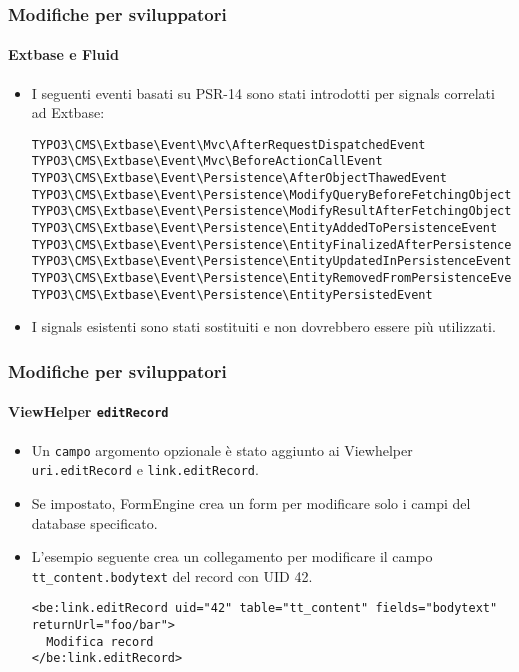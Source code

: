 \begin{frame}[fragile]
	\frametitle{Modifiche per sviluppatori}
	\framesubtitle{Extbase e Fluid}

	\lstset{basicstyle=\tiny\ttfamily}

	\begin{itemize}
		\item I seguenti eventi basati su PSR-14 sono stati introdotti per signals correlati ad Extbase:

\vspace{-0.4cm}
\begin{lstlisting}
TYPO3\CMS\Extbase\Event\Mvc\AfterRequestDispatchedEvent
TYPO3\CMS\Extbase\Event\Mvc\BeforeActionCallEvent
TYPO3\CMS\Extbase\Event\Persistence\AfterObjectThawedEvent
TYPO3\CMS\Extbase\Event\Persistence\ModifyQueryBeforeFetchingObjectDataEvent
TYPO3\CMS\Extbase\Event\Persistence\ModifyResultAfterFetchingObjectDataEvent
TYPO3\CMS\Extbase\Event\Persistence\EntityAddedToPersistenceEvent
TYPO3\CMS\Extbase\Event\Persistence\EntityFinalizedAfterPersistenceEvent
TYPO3\CMS\Extbase\Event\Persistence\EntityUpdatedInPersistenceEvent
TYPO3\CMS\Extbase\Event\Persistence\EntityRemovedFromPersistenceEvent
TYPO3\CMS\Extbase\Event\Persistence\EntityPersistedEvent
\end{lstlisting}

		\item I signals esistenti sono stati sostituiti e non dovrebbero essere più utilizzati.

	\end{itemize}

\end{frame}


\begin{frame}[fragile]
	\frametitle{Modifiche per sviluppatori}
	\framesubtitle{ViewHelper \texttt{editRecord}}

	\lstset{basicstyle=\tiny\ttfamily}

	\begin{itemize}
		\item Un \texttt{campo} argomento opzionale è stato aggiunto ai Viewhelper
			\texttt{uri.editRecord} e \texttt{link.editRecord}.
		\item Se impostato, FormEngine crea un form per modificare solo i campi del database specificato.
		\item L'esempio seguente crea un collegamento per modificare il campo \texttt{tt\_content.bodytext}
			 del record con UID 42.

\begin{lstlisting}
<be:link.editRecord uid="42" table="tt_content" fields="bodytext" returnUrl="foo/bar">
  Modifica record
</be:link.editRecord>
\end{lstlisting}

	\end{itemize}

\end{frame}


